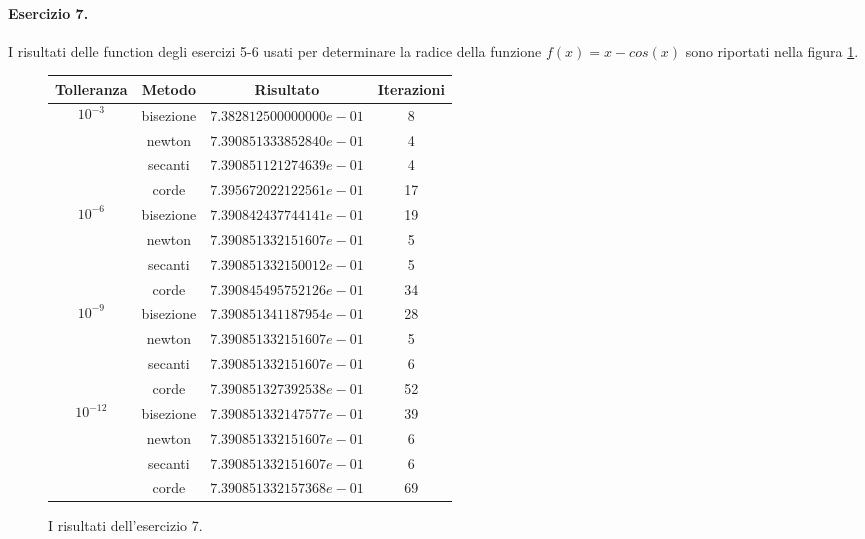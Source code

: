 \paragraph{Esercizio 7.} I risultati delle function degli esercizi 5-6 usati per determinare la radice della funzione $f(x) = x - cos(x)$ sono riportati nella figura \ref{fig:esercizio7}.

\begin{figure}
  \centering
  \begin{tabular}{ |c|c|c|c| }
    \hline
    Tolleranza & Metodo & Risultato & Iterazioni \\
    \hline\hline
    
    \multirow{4}{4em}{\[ 10^{-3} \]} & bisezione & $7.382812500000000e-01$ & 8 \\
    \cline{2-4}
    & newton & $7.390851333852840e-01$ & 4 \\
    \cline{2-4}
    & secanti & $7.390851121274639e-01$ & 4 \\
    \cline{2-4}
    & corde & $7.395672022122561e-01$ & 17 \\
    \hline\hline
    
    \multirow{4}{4em}{\[ 10^{-6} \]} & bisezione & $7.390842437744141e-01$ & 19 \\
    \cline{2-4}
    & newton & $7.390851332151607e-01$ & 5 \\
    \cline{2-4}
    & secanti & $7.390851332150012e-01$ & 5 \\
    \cline{2-4}
    & corde & $7.390845495752126e-01$ & 34 \\
    \hline\hline
    
    \multirow{4}{4em}{\[ 10^{-9} \]} & bisezione & $7.390851341187954e-01$ & 28 \\
    \cline{2-4}
    & newton & $7.390851332151607e-01$ & 5 \\
    \cline{2-4}
    & secanti & $7.390851332151607e-01$ & 6 \\
    \cline{2-4}
    & corde & $7.390851327392538e-01$ & 52 \\
    \hline\hline
    
    \multirow{4}{4em}{\[ 10^{-12} \]} & bisezione & $7.390851332147577e-01$ & 39 \\
    \cline{2-4}
    & newton & $7.390851332151607e-01$ & 6 \\
    \cline{2-4}
    & secanti & $7.390851332151607e-01$ & 6 \\
    \cline{2-4}
    & corde & $7.390851332157368e-01$ & 69 \\
    \hline
  \end{tabular}

  \caption{I risultati dell'esercizio 7.}
  \label{fig:esercizio7}
\end{figure}


